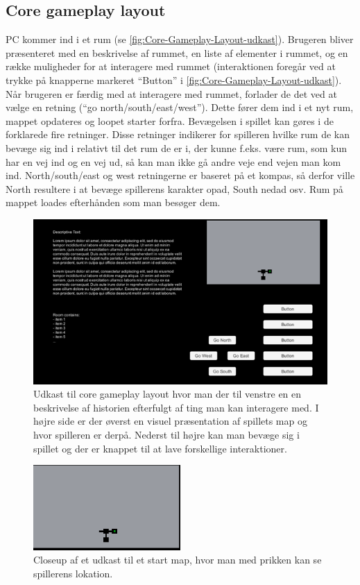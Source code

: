 \subsection{Core gameplay layout}
PC kommer ind i et rum (se \autoref{fig:Core-Gameplay-Layout-udkast}). Brugeren bliver præsenteret med en beskrivelse af rummet, en liste af elementer i rummet, og en række muligheder for at interagere med rummet (interaktionen foregår ved at trykke på knapperne markeret “Button” i \autoref{fig:Core-Gameplay-Layout-udkast}). Når brugeren er færdig med at interagere med rummet, forlader de det ved at vælge en retning (“go north/south/east/west”). 
Dette fører dem ind i et nyt rum, mappet opdateres og loopet starter forfra.
Bevægelsen i spillet kan gøres i de forklarede fire retninger. Disse retninger indikerer for spilleren hvilke rum de kan bevæge sig ind i relativt til det rum de er i, der kunne f.eks. være rum, som kun har en vej ind og en vej ud, så kan man ikke gå andre veje end vejen man kom ind. North/south/east og west retningerne er baseret på et kompas, så derfor ville North resultere i at bevæge spillerens karakter opad, South nedad osv.
Rum på mappet loades efterhånden som man besøger dem.

\begin{figure}[H]
\centering
\includegraphics[width = \textwidth]{02-Body/Images/SpilLayout-udkast.png}
\caption{Udkast til core gameplay layout hvor man der til venstre en en beskrivelse af historien efterfulgt af ting man kan interagere med. I højre side er der øverst en visuel præsentation af spillets map og hvor spilleren er derpå. Nederst til højre kan man bevæge sig i spillet og der er knappet til at lave forskellige interaktioner.}
\label{fig:Core-Gameplay-Layout-udkast}
\end{figure}

\begin{figure}[H]
\centering
\includegraphics[width = 0.5\textwidth]{02-Body/Images/Map-closeup.png}
\caption{Closeup af et udkast til et start map, hvor man med prikken kan se spillerens lokation.}
\label{fig:Map-Layout-udkast}
\end{figure}

